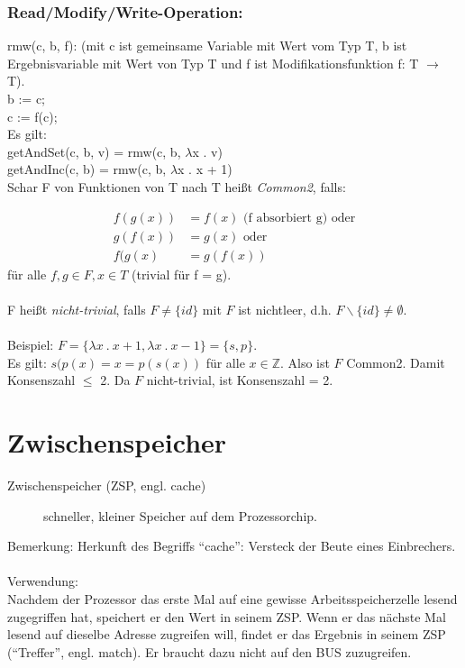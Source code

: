 \subsubsection*{Read/Modify/Write-Operation:}
rmw(c, b, f): (mit c ist gemeinsame Variable mit Wert vom Typ T, b ist Ergebnisvariable mit Wert von Typ T und f ist Modifikationsfunktion f: T $\rightarrow$ T).\\
b := c;\\
c := f(c);\\

Es gilt: \\
getAndSet(c, b, v) = rmw(c, b, $\lambda$x . v)\\
getAndInc(c, b) = rmw(c, b, $\lambda$x . x + 1)\\

Schar F von Funktionen von T nach T heißt \emph{Common2}, falls:

\begin{align}
	f(g(x)) & = f(x) \text{ (f absorbiert g) oder}\\
	g(f(x)) & = g(x) \text{ oder}\\
	f(g(x) & = g(f(x))	
\end{align}
für alle $f, g \in F, x \in T$ (trivial für f = g).\\
\\
F heißt \emph{nicht-trivial}, falls $ F \neq \{id\} $ mit $ F $ ist nichtleer, d.h. $ F \backslash \{id\} \neq \emptyset $.\\
\\
Beispiel: $ F = \{\lambda x\ .\ x + 1, \lambda x\ .\ x - 1\} = \{s, p\} $.\\
Es gilt: $ s(p(x) = x = p(s(x)) $ für alle $ x \in \mathbb{Z} $. Also ist $ F $ Common2. Damit Konsenszahl $\leq$ 2. Da $ F $ nicht-trivial, ist Konsenszahl = 2. 

\section{Zwischenspeicher}

\begin{description}
	\item[Zwischenspeicher (ZSP, engl. cache)] schneller, kleiner Speicher auf dem Prozessorchip.
\end{description}
Bemerkung: Herkunft des Begriffs "`cache"': Versteck der Beute eines Einbrechers.\\
\\
Verwendung:\\
Nachdem der Prozessor das erste Mal auf eine gewisse Arbeitsspeicherzelle lesend zugegriffen hat, speichert er den Wert in seinem ZSP. Wenn er das nächste Mal lesend auf dieselbe Adresse zugreifen will, findet er das Ergebnis in seinem ZSP ("`Treffer"', engl. match). Er braucht dazu nicht auf den BUS zuzugreifen.

